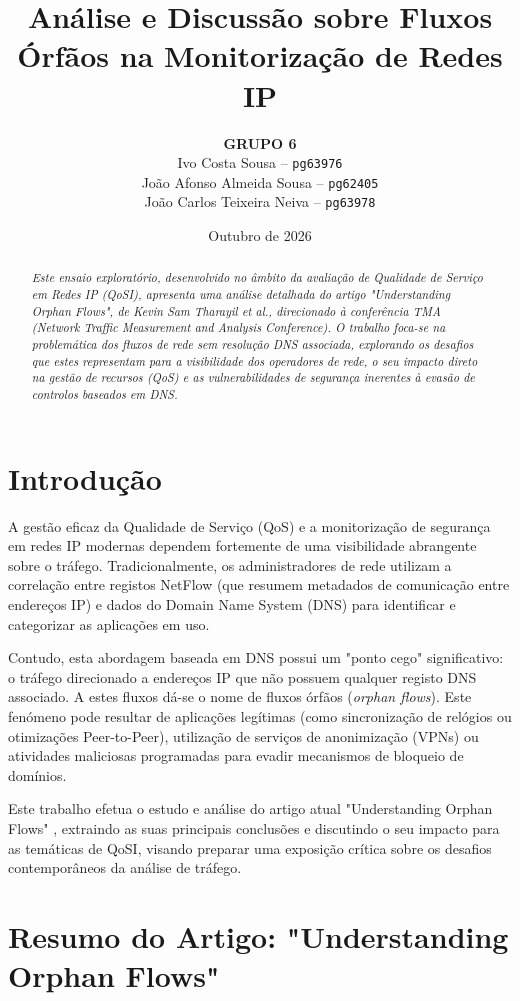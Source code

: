 \documentclass[11pt, a4paper]{article}
\title{Análise e Discussão sobre Fluxos Órfãos na Monitorização de Redes IP}
\author{
  \textbf{GRUPO 6} \\[0.4cm]
  Ivo Costa Sousa -- \texttt{pg63976} \\[0.15cm]
  João Afonso Almeida Sousa -- \texttt{pg62405} \\[0.15cm]
  João Carlos Teixeira Neiva -- \texttt{pg63978}
}
\date{Outubro de 2026}
\begin{document}
\maketitle

\begin{abstract}
\textit{Este ensaio exploratório, desenvolvido no âmbito da avaliação de Qualidade de Serviço em Redes IP (QoSI), apresenta uma análise detalhada do artigo "Understanding Orphan Flows", de Kevin Sam Tharayil et al., direcionado à conferência TMA (Network Traffic Measurement and Analysis Conference). O trabalho foca-se na problemática dos fluxos de rede sem resolução DNS associada, explorando os desafios que estes representam para a visibilidade dos operadores de rede, o seu impacto direto na gestão de recursos (QoS) e as vulnerabilidades de segurança inerentes à evasão de controlos baseados em DNS.}
\end{abstract}

\section{Introdução}
A gestão eficaz da Qualidade de Serviço (QoS) e a monitorização de segurança em redes IP modernas dependem fortemente de uma visibilidade abrangente sobre o tráfego. Tradicionalmente, os administradores de rede utilizam a correlação entre registos NetFlow (que resumem metadados de comunicação entre endereços IP) e dados do Domain Name System (DNS) para identificar e categorizar as aplicações em uso.

Contudo, esta abordagem baseada em DNS possui um "ponto cego" significativo: o tráfego direcionado a endereços IP que não possuem qualquer registo DNS associado. A estes fluxos dá-se o nome de fluxos órfãos (\textit{orphan flows}). Este fenómeno pode resultar de aplicações legítimas (como sincronização de relógios ou otimizações Peer-to-Peer), utilização de serviços de anonimização (VPNs) ou atividades maliciosas programadas para evadir mecanismos de bloqueio de domínios.

Este trabalho efetua o estudo e análise do artigo atual "Understanding Orphan Flows" \cite{tharayil2025}, extraindo as suas principais conclusões e discutindo o seu impacto para as temáticas de QoSI, visando preparar uma exposição crítica sobre os desafios contemporâneos da análise de tráfego.

\section{Resumo do Artigo: "Understanding Orphan Flows"}
\end{document}
